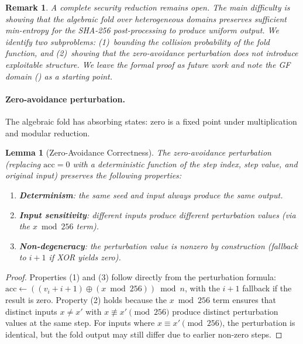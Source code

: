 \documentclass[conference,compsoc]{IEEEtran}
\newtheorem{lemma}[theorem]{Lemma}
\newtheorem*{remark}{Remark}
\begin{document}
\begin{remark}
A complete security reduction remains open. The main difficulty
is showing that the algebraic fold over heterogeneous domains
preserves sufficient min-entropy for the SHA-256 post-processing
to produce uniform output. We identify two subproblems:
(1)~bounding the collision probability of the fold function, and
(2)~showing that the zero-avoidance perturbation does not
introduce exploitable structure. We leave the formal proof as
future work and note the GF domain () as
a starting point.
\end{remark}

\paragraph{Zero-avoidance perturbation.}
The algebraic fold has absorbing states: zero is a fixed point
under multiplication and modular reduction.

\begin{lemma}[Zero-Avoidance Correctness]
\label{lem:zero-avoid}
The zero-avoidance perturbation (replacing $\mathrm{acc} = 0$ with
a deterministic function of the step index, step value, and
original input) preserves the following properties:
\begin{enumerate}
  \item \textbf{Determinism}: the same seed and input always
    produce the same output.
  \item \textbf{Input sensitivity}: different inputs produce
    different perturbation values (via the $x \bmod 256$ term).
  \item \textbf{Non-degeneracy}: the perturbation value is nonzero
    by construction (fallback to $i+1$ if XOR yields zero).
\end{enumerate}
\end{lemma}

\begin{proof}
Properties (1) and (3) follow directly from the perturbation
formula: $\mathrm{acc} \gets ((v_i + i + 1) \oplus (x \bmod 256))
\bmod n$, with the $i+1$ fallback if the result is zero.
%
Property (2) holds because the $x \bmod 256$ term ensures that
distinct inputs $x \neq x'$ with $x \not\equiv x' \pmod{256}$
produce distinct perturbation values at the same step.
%
For inputs where $x \equiv x' \pmod{256}$, the perturbation is
identical, but the fold output may still differ due to earlier
non-zero steps.
\end{proof}
\end{document}
